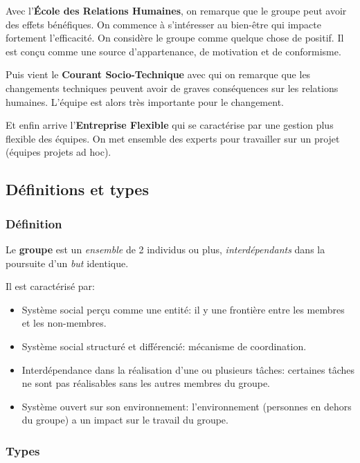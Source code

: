 \documentclass[12pt]{article}
\begin{document}
	Avec l'\textbf{École des Relations Humaines}, on remarque que le groupe peut avoir des effets bénéfiques. On commence à s'intéresser au bien-être qui impacte fortement l'efficacité. On considère le groupe comme quelque chose de positif. Il est conçu comme une source d'appartenance, de motivation et de conformisme.\newline
	
	Puis vient le \textbf{Courant Socio-Technique} avec qui on remarque que les changements techniques peuvent avoir de graves conséquences sur les relations humaines. L'équipe est alors très importante pour le changement.\newline
	
	Et enfin arrive l'\textbf{Entreprise Flexible} qui se caractérise par une gestion plus flexible des équipes. On met ensemble des experts pour travailler sur un projet (équipes projets ad hoc).
	
	\subsection{Définitions et types}
		\subsubsection{Définition}
		
		Le \textbf{groupe} est un \textit{ensemble} de 2 individus ou plus, \textit{interdépendants} dans la poursuite d'un \textit{but} identique. \newline
		
		Il est caractérisé par:
		\begin{itemize}
		\item Système social perçu comme une entité: il y une frontière entre les membres et les non-membres.
		\item Système social structuré et différencié: mécanisme de coordination.
		\item Interdépendance dans la réalisation d'une ou plusieurs tâches: certaines tâches ne sont pas réalisables sans les autres membres du groupe.
		\item Système ouvert sur son environnement: l'environnement (personnes en dehors du groupe) a un impact sur le travail du groupe.
		\end{itemize}
		
		\subsubsection{Types}
		
\end{document}
